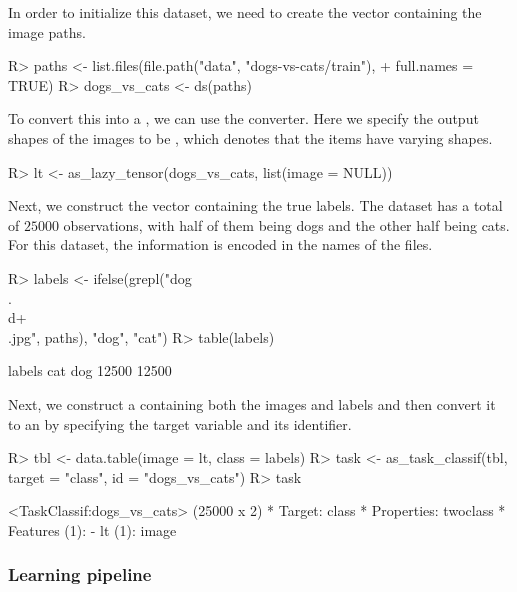 \documentclass[article]{jss}
\theoremstyle{definition}
\begin{document}
In order to initialize this dataset, we need to create the vector containing the image paths.

\begin{CodeInput}
R> paths <- list.files(file.path("data", "dogs-vs-cats/train"),
+    full.names = TRUE)
R> dogs_vs_cats <- ds(paths)
\end{CodeInput}

To convert this into a , we can use the  converter.
Here we specify the output shapes of the images to be , which denotes that the items have varying shapes.

\begin{CodeInput}
R> lt <- as_lazy_tensor(dogs_vs_cats, list(image = NULL))
\end{CodeInput}

Next, we construct the vector containing the true labels.
The dataset has a total of $25000$ observations, with half of them being dogs and the other half being cats.
For this dataset, the information is encoded in the names of the files.

\begin{CodeInput}
R> labels <- ifelse(grepl("dog\\.\\d+\\.jpg", paths), "dog", "cat")
R> table(labels)
\end{CodeInput}
\begin{CodeOutput}
labels
  cat   dog
12500 12500
\end{CodeOutput}

Next, we construct a  \citep{ref-datatable2024} containing both the images and labels and then convert it to an  by specifying the target variable and its identifier.

\begin{CodeInput}
R> tbl <- data.table(image = lt, class = labels)
R> task <- as_task_classif(tbl, target = "class", id = "dogs_vs_cats")
R> task
\end{CodeInput}
\begin{CodeOutput}
<TaskClassif:dogs_vs_cats> (25000 x 2)
* Target: class
* Properties: twoclass
* Features (1):
  - lt (1): image
\end{CodeOutput}

\subsubsection{Learning pipeline}
\end{document}
